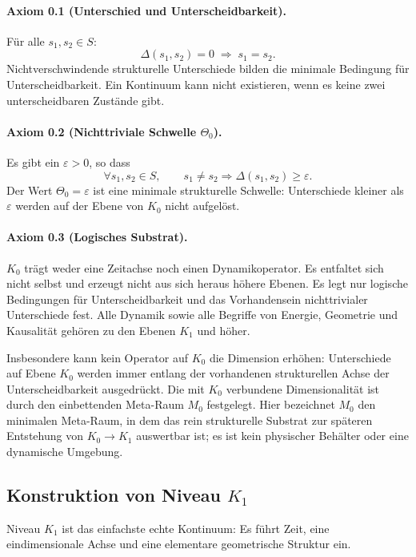 \paragraph{Axiom 0.1 (Unterschied und Unterscheidbarkeit).}
Für alle \(s_1,s_2 \in S\):
\[
    \Delta(s_1,s_2) = 0 \;\Rightarrow\; s_1 = s_2.
\]
Nichtverschwindende strukturelle Unterschiede bilden die minimale Bedingung für
Unterscheidbarkeit.
Ein Kontinuum kann nicht existieren, wenn es keine zwei unterscheidbaren
Zustände gibt.

\paragraph{Axiom 0.2 (Nichttriviale Schwelle \texorpdfstring{$\Theta_0$}{Theta\_0}).}
Es gibt ein \(\varepsilon > 0\), so dass
\[
    \forall s_1,s_2\in S,\qquad
    s_1 \neq s_2 \Rightarrow \Delta(s_1,s_2) \ge \varepsilon.
\]
Der Wert \(\Theta_0 = \varepsilon\) ist eine minimale strukturelle Schwelle:
Unterschiede kleiner als \(\varepsilon\) werden auf der Ebene von \(K_0\) nicht
aufgelöst.

\paragraph{Axiom 0.3 (Logisches Substrat).}
\(K_0\) trägt weder eine Zeitachse noch einen Dynamikoperator.
Es entfaltet sich nicht selbst und erzeugt nicht aus sich heraus höhere Ebenen.
Es legt nur logische Bedingungen für Unterscheidbarkeit und das
Vorhandensein nichttrivialer Unterschiede fest.
Alle Dynamik sowie alle Begriffe von Energie, Geometrie und Kausalität
gehören zu den Ebenen \(K_1\) und höher.

Insbesondere kann kein Operator auf \(K_0\) die Dimension erhöhen:
Unterschiede auf Ebene \(K_0\) werden immer entlang der vorhandenen
strukturellen Achse der Unterscheidbarkeit ausgedrückt.
Die mit \(K_0\) verbundene Dimensionalität ist durch den einbettenden
Meta-Raum \(M_0\) festgelegt.
Hier bezeichnet \(M_0\) den minimalen Meta-Raum, in dem das rein
strukturelle Substrat zur späteren Entstehung von \(K_0\to K_1\) auswertbar ist;
es ist kein physischer Behälter oder eine dynamische Umgebung.

\subsection{Konstruktion von Niveau \texorpdfstring{$K_1$}{K\_1}}

Niveau \(K_1\) ist das einfachste echte Kontinuum: Es führt Zeit,
eine eindimensionale Achse und eine elementare geometrische Struktur ein.

